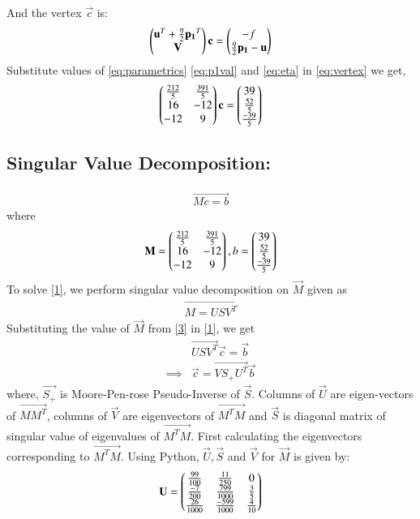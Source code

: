 \documentclass[journal,12pt,twocolumn]{IEEEtran}
\begin{document}
And the vertex $\vec{c}$ is:
\begin{align}
 \begin{pmatrix}\mathbf{u}^T+\frac{\eta}{2} \mathbf{p_1}^T \\ \mathbf{V}\end{pmatrix}\mathbf{c} = \begin{pmatrix}-f \\ \frac{\eta}{2}\mathbf{p_1}-\mathbf{u}\end{pmatrix} \label{eq:vertex}
\end{align}
Substitute values of \eqref{eq:parametrics} \eqref{eq:p1val} and \eqref{eq:eta} in \eqref{eq:vertex} we get,
\begin{align}
\begin{pmatrix}\frac{212}{5} & \frac{391}{5} \\ 16 & -12 \\ -12 & 9\end{pmatrix}\mathbf{c}=\begin{pmatrix}39 \\ \frac{52}{5}\\ \frac{-39}{5}\end{pmatrix}
\end{align}
\subsection{Singular Value Decomposition:}
\begin{align}
\vec{Mc=b} \label{1}
\end{align}
where
\begin{align}
\mathbf{M} = \begin{pmatrix}\frac{212}{5} & \frac{391}{5} \\ 16 & -12 \\ -12 & 9\end{pmatrix},b = \begin{pmatrix}39 \\\frac{52}{5}\\\frac{-39}{5}\end{pmatrix}\label{eq:2}	
\end{align}
To solve \eqref{1}, we perform singular value decomposition on $\vec{M}$ given as 
\begin{align}
	\vec{M = USV^T }\label{3}
\end{align}
Substituting the value of $\vec{M}$ from \eqref{3} in \eqref{1}, we get
\begin{align}
	&\vec{USV^T}\vec{c} = \vec{b} \\
\implies& \vec{c} = \vec{VS_+U^T}\vec{b}\label{eq:4}
\end{align}
where, $\vec{S_+}$ is Moore-Pen-rose Pseudo-Inverse of $\vec{S}$. Columns of $\vec{U}$ are eigen-vectors of $\vec{MM^T}$, columns of $\vec{V}$ are eigenvectors of $\vec{M^TM}$ and $\vec{S}$ is diagonal matrix of singular value of eigenvalues of $\vec{M^TM}$. First calculating the eigenvectors corresponding to $\vec{M^TM}$.\newline
Using Python, $\vec{U}, \vec{S}$ and $\vec{V}$ for $\vec{M}$ is given by: 
\begin{align}
	 \mathbf{U} = \begin{pmatrix}\frac{99}{100} & \frac{11}{250} & 0 \\ \frac{-7}{200} & \frac{799}{1000} & \frac{3}{5} \\ \frac{26}{1000} & \frac{-599}{1000} & \frac{4}{10} \end{pmatrix} \label{eq:U}
\end{align}
\end{document}
